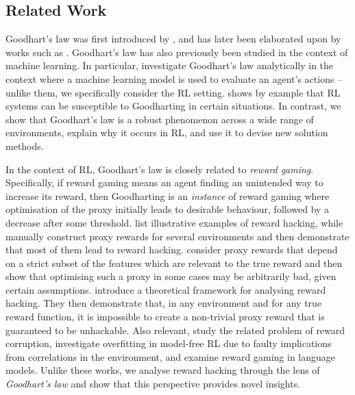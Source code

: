 
\subsection{Related Work}\label{sec:related-work}

Goodhart’s law  was first introduced by \citet{goodhart_problems_1975}, and has later been elaborated upon by works such as \citet{manheim_categorizing_2019}.
Goodhart's law has also previously been studied in the context of machine learning. 
In particular, \citet{hennessy_goodharts_2023} investigate Goodhart's law analytically in the context where a machine learning model is used to evaluate an agent’s actions -- unlike them, we specifically consider the RL setting. \citet{ashton_causal_2021} shows by example that RL systems can be susceptible to Goodharting in certain situations. In contrast, we show that Goodhart's law is a robust phenomenon across a wide range of environments, explain why it occurs in RL, and use it to devise new solution methods.

In the context of RL, Goodhart's law is closely related to \emph{reward gaming}. Specifically, if reward gaming means an agent finding an unintended way to increase its reward, then Goodharting is an \emph{instance} of reward gaming where optimisation of the proxy initially leads to desirable behaviour, followed by a decrease after some threshold.
 list illustrative examples of reward hacking, while \citet{reward_misspecification} manually construct proxy rewards for several environments and then demonstrate that most of them lead to reward hacking.
\citet{subset_features} consider proxy rewards that depend on a strict subset of the features which are relevant to the true reward and then show that optimising such a proxy in some cases may be arbitrarily bad, given certain assumptions.
\cite{skalse_defining_2022} introduce a theoretical framework for analysing reward hacking. They then demonstrate that, in any environment and for any true reward function, it is impossible to create a non-trivial proxy reward that is guaranteed to be unhackable. 
Also relevant, \citet{reward_corruption} study the related problem of reward corruption, \citet{song_observational_2019} investigate overfitting in model-free RL due to faulty implications from correlations in the environment, and
\citet{pang_reward_2023} examine reward gaming in language models. 
Unlike these works, we analyse reward hacking through the lens of \emph{Goodhart's law} and show that this perspective provides novel insights.


